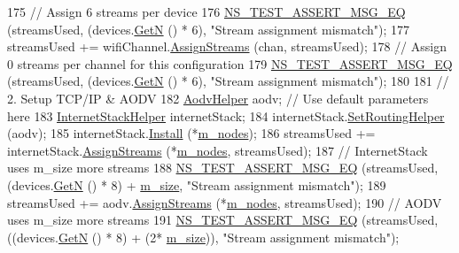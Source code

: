 \begin{DoxyCode}
175   \textcolor{comment}{// Assign 6 streams per device}
176   \hyperlink{group__testing_ga2a9d78cffb3db8e867c35fff0b698cf5}{NS\_TEST\_ASSERT\_MSG\_EQ} (streamsUsed, (devices.\hyperlink{classns3_1_1NetDeviceContainer_a74cafc212479bc38976bebd118e856b9}{GetN} () * 6), \textcolor{stringliteral}{"Stream assignment
       mismatch"});
177   streamsUsed += wifiChannel.\hyperlink{classns3_1_1YansWifiChannelHelper_ab409a15cfb8abb5195177625191e2584}{AssignStreams} (chan, streamsUsed);
178   \textcolor{comment}{// Assign 0 streams per channel for this configuration }
179   \hyperlink{group__testing_ga2a9d78cffb3db8e867c35fff0b698cf5}{NS\_TEST\_ASSERT\_MSG\_EQ} (streamsUsed, (devices.\hyperlink{classns3_1_1NetDeviceContainer_a74cafc212479bc38976bebd118e856b9}{GetN} () * 6), \textcolor{stringliteral}{"Stream assignment
       mismatch"});
180 
181   \textcolor{comment}{// 2. Setup TCP/IP & AODV}
182   \hyperlink{classns3_1_1AodvHelper}{AodvHelper} aodv; \textcolor{comment}{// Use default parameters here}
183   \hyperlink{classns3_1_1InternetStackHelper}{InternetStackHelper} internetStack;
184   internetStack.\hyperlink{classns3_1_1InternetStackHelper_a3e382c02df022dec79952a7eca8cd5ba}{SetRoutingHelper} (aodv);
185   internetStack.\hyperlink{classns3_1_1InternetStackHelper_a6645b412f31283d2d9bc3d8a95cebbc0}{Install} (*\hyperlink{classChainRegressionTest_a9df3157b70f521bddeb6184f0e7c48a3}{m\_nodes});
186   streamsUsed += internetStack.\hyperlink{classns3_1_1InternetStackHelper_a63c904e832a2f17e036338db4aa2f1b8}{AssignStreams} (*\hyperlink{classChainRegressionTest_a9df3157b70f521bddeb6184f0e7c48a3}{m\_nodes}, streamsUsed);
187   \textcolor{comment}{// InternetStack uses m\_size more streams}
188   \hyperlink{group__testing_ga2a9d78cffb3db8e867c35fff0b698cf5}{NS\_TEST\_ASSERT\_MSG\_EQ} (streamsUsed, (devices.\hyperlink{classns3_1_1NetDeviceContainer_a74cafc212479bc38976bebd118e856b9}{GetN} () * 8) + 
      \hyperlink{classChainRegressionTest_a0b140f49f0f8bad41cba6bd2c68c11b8}{m\_size}, \textcolor{stringliteral}{"Stream assignment mismatch"});
189   streamsUsed += aodv.\hyperlink{classns3_1_1AodvHelper_a478d356b61ddc4a3384bd50153113f74}{AssignStreams} (*\hyperlink{classChainRegressionTest_a9df3157b70f521bddeb6184f0e7c48a3}{m\_nodes}, streamsUsed);
190   \textcolor{comment}{// AODV uses m\_size more streams}
191   \hyperlink{group__testing_ga2a9d78cffb3db8e867c35fff0b698cf5}{NS\_TEST\_ASSERT\_MSG\_EQ} (streamsUsed, ((devices.\hyperlink{classns3_1_1NetDeviceContainer_a74cafc212479bc38976bebd118e856b9}{GetN} () * 8) + (2*
      \hyperlink{classChainRegressionTest_a0b140f49f0f8bad41cba6bd2c68c11b8}{m\_size})), \textcolor{stringliteral}{"Stream assignment mismatch"});

\end{DoxyCode}
